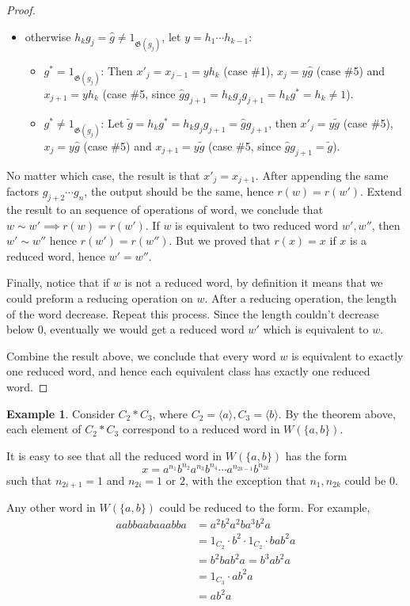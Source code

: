 \documentclass[a4paper,titlepage]{article}
\theoremstyle{remark}
\theoremstyle{definition}
\newtheorem{example}{Example}
\theoremstyle{definition}
\theoremstyle{plain}
\newcommand{\gid}{\mathfrak{G}}
\begin{document}
\begin{proof}
\begin{itemize}
      \item otherwise $h_k g_j = \hat{g} \neq 1_{\gid(g_j)}$, let $y = h_1 \cdots h_{k-1}$:
        \begin{itemize}
          \item $g^* = 1_{\gid(g_j)}$: Then $x'_j = x_{j-1} = y h_k$ (case \#1), 
            $x_j = y \hat{g}$ (case \#5) and
            $x_{j+1} = y h_k$ (case \#5, since $\hat{g} g_{j+1} = h_k g_j g_{j+1} = h_k g^* = h_k \neq 1$). 
          \item $g^* \neq 1_{\gid(g_j)}$: Let $\tilde{g} = h_k g^* = h_k g_j g_{j+1} = \hat{g} g_{j+1}$, 
            then $x'_j = y \tilde{g}$ (case \#5), 
            $x_j = y \hat{g}$ (case \#5) and
            $x_{j+1} = y \tilde{g}$ (case \#5, since $\hat{g} g_{j+1} = \tilde{g}$). 
      \end{itemize}
    \end{itemize}
    No matter which case, the result is that $x'_j = x_{j+1}$.
    After appending the same factors $g_{j+2} \cdots g_n$, the output should be the same, hence
    $r(w) = r(w')$. Extend the result to an sequence of operations of word, we conclude that
    $w \sim w' \implies r(w) = r(w')$. If $w$ is equivalent to two reduced word $w', w''$,
    then $w' \sim w''$ hence $r(w') = r(w'')$. But we proved that $r(x) = x$ if $x$ is a reduced word,
    hence $w' = w''$.

    Finally, notice that if $w$ is not a reduced word, by definition it means that we could preform a reducing
    operation on $w$. After a reducing operation, the length of the word decrease. Repeat this process.
    Since the length couldn't decrease below $0$, eventually we would get a reduced word $w'$ which is equivalent to
    $w$.
    
    Combine the result above, we conclude that every word $w$ is equivalent to exactly one reduced
    word, and hence each equivalent class has exactly one reduced word.
  \end{proof}

  \begin{example}
    Consider $C_2 \ast C_3$, where $C_2 = \langle a \rangle, C_3 = \langle b \rangle$. By the
    theorem above, each element of $C_2 \ast C_3$ correspond to a reduced word in $W(\{a, b\})$.

    It is easy to see that all the reduced word in $W(\{a, b\})$ has the form
    \[ x = a^{n_1} b^{n_2} a^{n_3} b^{n_4} \cdots a^{n_{2k-1}} b^{n_{2k}} \]
    such that $n_{2i+1} = 1$ and $n_{2i} = 1 \text{ or } 2$, with the exception that
    $n_1, n_{2k}$ could be $0$.

    Any other word in $W(\{a, b\})$ could be reduced to the form. For example,
    \begin{align*}
      a a b b a a b a a a b b a &= a^2 b^2 a^2 b a^3 b^2 a \\
      &= 1_{C_2} \cdot b^2 \cdot 1_{C_2} \cdot b a b^2 a \\
      &= b^2 b a b^2 a = b^3 a b^2 a \\
      &= 1_{C_3} \cdot a b^2 a \\
      &= a b^2 a
    \end{align*}
  \end{example}
\end{document}
